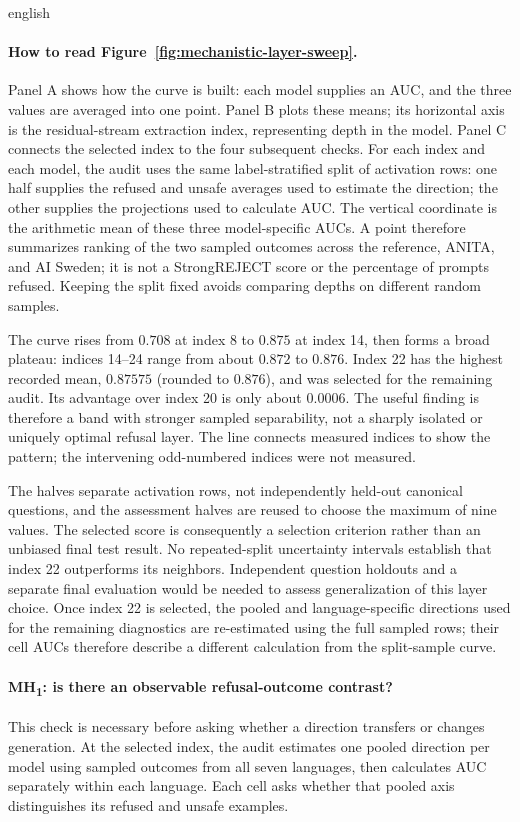 \begin{otherlanguage*}{english}
\paragraph*{How to read Figure~\ref{fig:mechanistic-layer-sweep}.} Panel A shows how the curve is built: each model supplies an AUC, and the three values are averaged into one point. Panel B plots these means; its horizontal axis is the residual-stream extraction index, representing depth in the model. Panel C connects the selected index to the four subsequent checks. For each index and each model, the audit uses the same label-stratified split of activation rows: one half supplies the refused and unsafe averages used to estimate the direction; the other supplies the projections used to calculate AUC. The vertical coordinate is the arithmetic mean of these three model-specific AUCs. A point therefore summarizes ranking of the two sampled outcomes across the reference, ANITA, and AI Sweden; it is not a StrongREJECT score or the percentage of prompts refused. Keeping the split fixed avoids comparing depths on different random samples.

The curve rises from $0.708$ at index 8 to $0.875$ at index 14, then forms a broad plateau: indices 14--24 range from about $0.872$ to $0.876$. Index 22 has the highest recorded mean, $0.87575$ (rounded to $0.876$), and was selected for the remaining audit. Its advantage over index 20 is only about $0.0006$. The useful finding is therefore a band with stronger sampled separability, not a sharply isolated or uniquely optimal refusal layer. The line connects measured indices to show the pattern; the intervening odd-numbered indices were not measured.

The halves separate activation rows, not independently held-out canonical questions, and the assessment halves are reused to choose the maximum of nine values. The selected score is consequently a selection criterion rather than an unbiased final test result. No repeated-split uncertainty intervals establish that index 22 outperforms its neighbors. Independent question holdouts and a separate final evaluation would be needed to assess generalization of this layer choice. Once index 22 is selected, the pooled and language-specific directions used for the remaining diagnostics are re-estimated using the full sampled rows; their cell AUCs therefore describe a different calculation from the split-sample curve.



\paragraph*{MH\textsubscript{1}: is there an observable refusal-outcome contrast?} This check is necessary before asking whether a direction transfers or changes generation. At the selected index, the audit estimates one pooled direction per model using sampled outcomes from all seven languages, then calculates AUC separately within each language. Each cell asks whether that pooled axis distinguishes its refused and unsafe examples.


\end{otherlanguage*}
